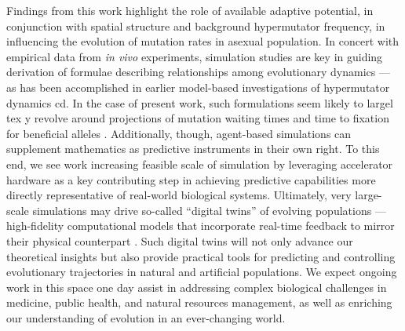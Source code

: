 Findings from this work highlight the role of available adaptive potential, in conjunction with spatial structure and background hypermutator frequency, in influencing the evolution of mutation rates in asexual population.
In concert with empirical data from \textit{in vivo} experiments, simulation studies are key in guiding derivation of formulae describing relationships among evolutionary dynamics --- as has been accomplished in earlier model-based investigations of hypermutator dynamics \citep{raynes2018sign,raynes2019migration,raynes2019selection}cd.
In the case of present work, such formulations seem likely to largel tex
y revolve around projections of mutation waiting times and time to fixation for beneficial alleles \citep{ribeck2016competition}.
Additionally, though, agent-based simulations can supplement mathematics as predictive instruments in their own right.
To this end, we see work increasing feasible scale of simulation by leveraging accelerator hardware as a key contributing step in achieving predictive capabilities more directly representative of real-world biological systems.
Ultimately, very large-scale simulations may drive so-called ``digital twins'' of evolving populations --- high-fidelity computational models that incorporate real-time feedback to mirror their physical counterpart \citep{dekoning2023digital}.
Such digital twins will not only advance our theoretical insights but also provide practical tools for predicting and controlling evolutionary trajectories in natural and artificial populations.
We expect ongoing work in this space one day assist in addressing complex biological challenges in medicine, public health, and natural resources management, as well as enriching our understanding of evolution in an ever-changing world.

